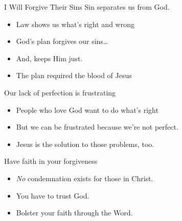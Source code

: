 \begin{frame}{I Will Forgive Their Sins}
Sin separates us from God.
\begin{itemize}
	\item Law shows us what's right and wrong
	\item God's plan forgives our sins\ldots
	\item And, keeps Him just.
	\item The plan required the blood of Jesus
\end{itemize}
Our lack of perfection is frustrating
\begin{itemize}
	\item People who love God want to do what's right
	\item But we can be frustrated because we're not perfect.
	\item Jesus is the solution to those problems, too.
\end{itemize}
Have faith in your forgiveness
\begin{itemize}
	\item \emph{No} condemnation exists for those in Christ.
	\item You have to trust God.
	\item Bolster your faith through the Word.
\end{itemize}
	
\end{frame}
